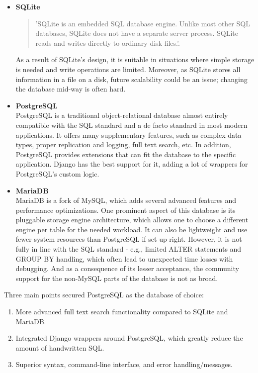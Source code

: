 \begin{itemize}
    \item \textbf{SQLite} \\
    \begin{quote}
        'SQLite is an embedded SQL database engine.
        Unlike most other SQL databases, SQLite does not have a separate
        server process. SQLite reads and writes directly to ordinary disk
        files.'\cite{sqlite}.
    \end{quote}
    As a result of SQLite's design, it is suitable
    in situations where simple storage is needed and write operations are limited.
    Moreover, as SQLite stores all information in a file on a disk, future scalability could be an issue;
    changing the database mid-way is often hard.

    \item \textbf{PostgreSQL} \\
    PostgreSQL is a traditional object-relational database almost entirely compatible with the SQL standard
    and a de facto standard in most modern applications. It offers many supplementary features,
    such as complex data types, proper replication and logging, full text search, etc.
    In addition, PostgreSQL provides extensions that can fit the database to the specific application.
    \cite{postgres}
    Django has the best support for it, adding a lot of wrappers for PostgreSQL's custom logic.\cite{django_postgres}

    \item \textbf{MariaDB} \\
    MariaDB is a fork of MySQL, which adds several advanced features and performance optimizations.
    One prominent aspect of this database is its pluggable storage engine architecture,
    which allows one to choose a different engine per table for the needed workload.\cite{mariadb}
    It can also be lightweight and use fewer system resources than PostgreSQL if set up right.
    However, it is not fully in line with the SQL standard -
    e.g., limited ALTER statements and GROUP BY handling\cite{dbfunctions}, which often lead to unexpected time losses
    with debugging.
    And as a consequence of its lesser acceptance\cite{dbrank},
    the community support for the non-MySQL parts of the database is not as broad.
\end{itemize}
Three main points secured PostgreSQL as the database of choice:
\begin{enumerate}
    \item More advanced full text search functionality compared to SQLite and MariaDB.
    \item Integrated Django wrappers around PostgreSQL, which greatly reduce the amount of handwritten SQL.
    \item Superior syntax, command-line interface, and error handling/messages.
\end{enumerate}

